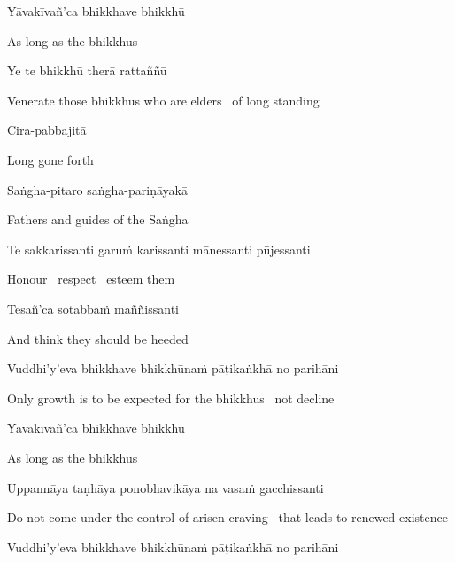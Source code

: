 Yāvakīvañ'ca bhikkhave bhikkhū

\begin{english}
  As long as the bhikkhus
\end{english}

Ye te bhikkhū therā rattaññū

\begin{english}
  Venerate those bhikkhus who are elders \breathmark\ of long standing
\end{english}

Cira-pabbajitā

\begin{english}
  Long gone forth
\end{english}

Saṅgha-pitaro saṅgha-pariṇāyakā

\begin{english}
  Fathers and guides of the Saṅgha
\end{english}

\ifninebythirteenversion\clearpage\fi

Te sakkarissanti garuṁ karissanti mānessanti pūjessanti

\begin{english}
  Honour \breathmark\ respect \breathmark\ esteem them
\end{english}

Tesañ'ca sotabbaṁ maññissanti

\begin{english}
  And think they should be heeded
\end{english}

Vuddhi'y'eva bhikkhave bhikkhūnaṁ pāṭikaṅkhā no parihāni

\begin{english}
  Only growth is to be expected for the bhikkhus \breathmark\ not decline
\end{english}

Yāvakīvañ'ca bhikkhave bhikkhū

\begin{english}
  As long as the bhikkhus
\end{english}

Uppannāya taṇhāya ponobhavikāya na vasaṁ gacchissanti

\begin{english-hang}
  Do not come under the control of arisen craving \breathmark\ that leads to renewed existence
\end{english-hang}

Vuddhi'y'eva bhikkhave bhikkhūnaṁ pāṭikaṅkhā no parihāni

